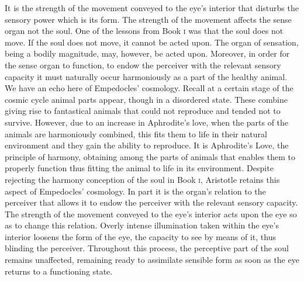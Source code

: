 It is the strength of the movement conveyed to the eye's interior that disturbs the sensory power which is its form. The strength of the movement affects the sense organ not the soul. One of the lessons from Book \textsc{i} was that the soul does not move. If the soul does not move, it cannot be acted upon. The organ of sensation, being a bodily magnitude, may, however, be acted upon. Moreover, in order for the sense organ to function, to endow the perceiver with the relevant sensory capacity it must naturally occur harmoniously as a part of the healthy animal. We have an echo here of Empedocles' cosmology. Recall at a certain stage of the cosmic cycle animal parts appear, though in a disordered state. These combine giving rise to fantastical animals that could not reproduce and tended not to survive. However, due to an increase in Aphrodite's love, when the parts of the animals are harmoniously combined, this fits them to life in their natural environment and they gain the ability to reproduce. It is Aphrodite's Love, the principle of harmony, obtaining among the parts of animals that enables them to properly function thus fitting the animal to life in its environment. Despite rejecting the harmony conception of the soul in Book \textsc{i}, Aristotle retains this aspect of Empedocles' cosmology. In part it is the organ's relation to the perceiver that allows it to endow the perceiver with the relevant sensory capacity. The strength of the movement conveyed to the eye's interior acts upon the eye so as to change this relation. Overly intense illumination taken within the eye's interior loosens the form of the eye, the capacity to see by means of it, thus blinding the perceiver. Throughout this process, the perceptive part of the soul remains unaffected, remaining ready to assimilate sensible form as soon as the eye returns to a functioning state.

